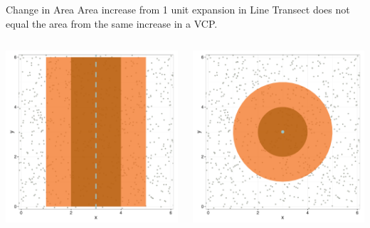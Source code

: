 \documentclass{beamer}
\begin{document}
\begin{frame}{Change in Area}
	Area increase from 1 unit expansion in Line Transect does not equal the area from the same increase in a VCP.
	\begin{columns}
		\begin{column}{0.48\textwidth}
		\includegraphics[width=\textwidth]{../images/slides-LTr.pdf}
		\end{column}
		\begin{column}{0.48\textwidth}
		\includegraphics[width=\textwidth]{../images/slides-VCPr.pdf}
		\end{column}
	\end{columns}

\end{frame}
\end{document}
